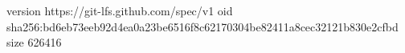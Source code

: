 version https://git-lfs.github.com/spec/v1
oid sha256:bd6eb73eeb92d4ea0a23be6516f8c62170304be82411a8cec32121b830e2cfbd
size 626416
